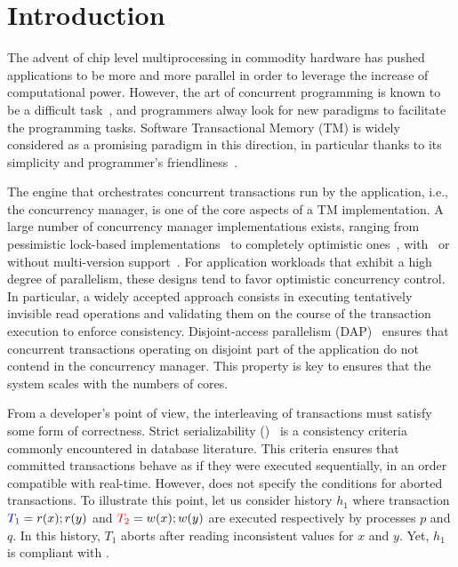 \section{Introduction}

The advent of chip level multiprocessing in commodity hardware has pushed applications to be more and more parallel in order to leverage the increase of computational power.
However, the art of concurrent programming is known to be a difficult task~\cite{Lee:2006:PT:1137232.1137289}, and programmers alway look for new paradigms to facilitate the programming tasks.
Software Transactional Memory (TM) is widely considered as a promising paradigm in this direction, in particular thanks to its simplicity and programmer's friendliness~\cite{Dragojevic:2011:WSM:1924421.1924440}.

The engine that orchestrates concurrent transactions run by the application, i.e., the concurrency manager, is one of the core aspects of a TM implementation.
A large number of concurrency manager implementations exists, ranging from pessimistic lock-based implementations~\cite{harris2005revocable,afek2012pessimistic} to completely optimistic ones~\cite{hassan2014optimistic}, with~\cite{perelman2011smv} or without multi-version support~\cite{attiya2012single}.
For application workloads that exhibit a high degree of parallelism, these designs tend to favor optimistic concurrency control.
In particular, a widely accepted approach consists in executing tentatively invisible read operations and validating them on the course of the transaction execution to enforce consistency.
Disjoint-access parallelism (DAP)~\cite{ellen2012universal} ensures that concurrent transactions operating on disjoint part of the application do not contend in the concurrency manager.
This property is key to ensures that the system scales with the numbers of cores.

From a developer's point of view, the interleaving of transactions must satisfy some form of correctness.
Strict serializability (\SSER)~\cite{herlihy1990linearizability} is a consistency criteria commonly encountered in database literature.
This criteria ensures that committed transactions behave as if they were executed sequentially, in an order compatible with real-time.
However, \SSER does not specify the conditions for aborted transactions.
To illustrate this point, let us consider history $h_1$ where transaction ${\color{blue}{T_1}}=r(x);r(y)$ and ${\color{red}{T_2}}=w(x);w(y)$ are executed respectively by processes $p$ and $q$.
In this history, $T_1$ aborts after reading inconsistent values for $x$ and $y$.
Yet, $h_1$ is compliant with \SSER.


